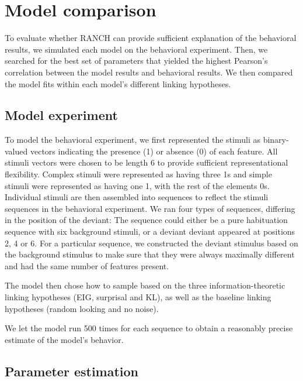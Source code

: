 \documentclass[10pt, letterpaper]{article}
\begin{document}
\hypertarget{model-comparison}{%
\section{Model comparison}\label{model-comparison}}

To evaluate whether RANCH can provide sufficient explanation of the
behavioral results, we simulated each model on the behavioral
experiment. Then, we searched for the best set of parameters that
yielded the highest Pearson's correlation between the model results and
behavioral results. We then compared the model fits within each model's
different linking hypotheses.

\hypertarget{model-experiment}{%
\subsection{Model experiment}\label{model-experiment}}

To model the behavioral experiment, we first represented the stimuli as
binary-valued vectors indicating the presence (1) or absence (0) of each
feature. All stimuli vectors were chosen to be length 6 to provide
sufficient representational flexibility. Complex stimuli were
represented as having three 1s and simple stimuli were represented as
having one 1, with the rest of the elements 0s. Individual stimuli are
then assembled into sequences to reflect the stimuli sequences in the
behavioral experiment. We ran four types of sequences, differing in the
position of the deviant: The sequence could either be a pure habituation
sequence with six background stimuli, or a deviant deviant appeared at
positions 2, 4 or 6. For a particular sequence, we constructed the
deviant stimulus based on the background stimulus to make sure that they
were always maximally different and had the same number of features
present.

The model then chose how to sample based on the three
information-theoretic linking hypotheses (EIG, surprisal and KL), as
well as the baseline linking hypotheses (random looking and no noise).

We let the model run 500 times for each sequence to obtain a reasonably
precise estimate of the model's behavior.

\hypertarget{parameter-estimation}{%
\subsection{Parameter estimation}\label{parameter-estimation}}
\end{document}
